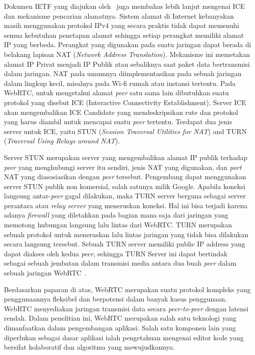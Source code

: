 Dokumen IETF yang diajukan oleh~\cite{rfc8839} juga membahas lebih lanjut mengenai ICE dan mekanisme pencarian alamatnya. Sistem alamat di Internet kebanyakan masih menggunakan protokol IPv4 yang secara praktis tidak dapat memenuhi semua kebutuhan penetapan alamat sehingga setiap perangkat memiliki alamat IP yang berbeda. Perangkat yang digunakan pada suatu jaringan dapat berada di belakang lapisan NAT (\textit{Network Address Translation}). Mekanisme ini memetakan alamat IP Privat menjadi IP Publik atau sebaliknya saat paket data bertransmisi dalam jaringan. NAT pada umumnya diimplementasikan pada sebuah jaringan dalam lingkup kecil, misalnya pada Wi-fi rumah atau instansi tertentu. Pada WebRTC, untuk mengetahui alamat \textit{peer} satu sama lain dibutuhkan suatu protokol yang disebut ICE (Interactive Connectivity Establishment). Server ICE akan mengembalikan ICE Candidate yang mendeskripsikan rute dan protokol yang harus diambil untuk mencapai suatu \textit{peer} tertentu. Terdapat dua jenis server untuk ICE, yaitu STUN (\textit{Session Traversal Utilities for NAT}) and TURN (\textit{Traversal Using Relays around NAT}).

Server STUN merupakan server yang mengembalikan alamat IP publik terhadap \textit{peer} yang menghubungi server itu sendiri, jenis NAT yang digunakan, dan \textit{port} NAT yang diasosiasikan dengan \textit{peer} tersebut. Pengembang dapat menggunakan server STUN publik non komersial, salah satunya milik Google. Apabila koneksi langsung antar-\textit{peer} gagal dilakukan, maka TURN server berguna sebagai server perantara atau \textit{relay server} yang meneruskan koneksi. Hal ini bisa terjadi karena adanya \textit{firewall} yang diletakkan pada bagian mana saja dari jaringan yang memotong hubungan langsung lalu lintas dari WebRTC. TURN merupakan sebuah protokol untuk meneruskan lalu lintas jaringan yang tidak bisa dilakukan secara langsung tersebut. Sebuah TURN server memiliki public IP address yang dapat diakses oleh kedua \textit{peer}, sehingga TURN Server ini dapat bertindak sebagai sebuah jembatan dalam transmisi media antara dua buah \textit{peer} dalam sebuah jaringan WebRTC~\citep{rfc5766}.\newline

Berdasarkan paparan di atas, WebRTC merupakan suatu protokol kompleks yang penggunaannya fleksibel dan berpotensi dalam banyak kasus penggunaan. WebRTC menyediakan jaringan transmisi data secara \textit{peer-to-peer} dengan latensi rendah. Dalam penelitian ini, WebRTC merupakan salah satu teknologi yang dimanfaatkan dalam pengembangan aplikasi. Salah satu komponen lain yang diperlukan sebagai dasar aplikasi ialah pengetahuan mengenai editor kode yang bersifat kolaboratif dan algoritma yang mewujudkannya.

